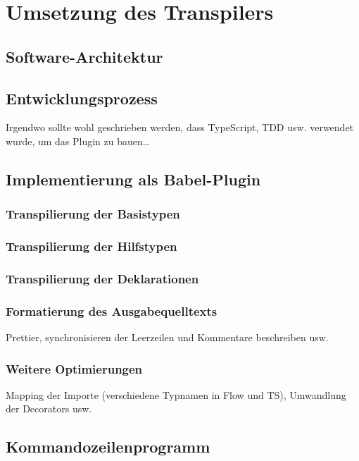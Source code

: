 \chapter{Umsetzung des Transpilers}

\section{Software-Architektur}

\section{Entwicklungsprozess}
  Irgendwo sollte wohl geschrieben werden, dass TypeScript, TDD usw. verwendet wurde, um das Plugin zu bauen\dots

\section{Implementierung als Babel-Plugin}
  \subsection{Transpilierung der Basistypen}
  \subsection{Transpilierung der Hilfstypen}
  \subsection{Transpilierung der Deklarationen}

  \subsection{Formatierung des Ausgabequelltexts}

  Prettier, synchronisieren der Leerzeilen und Kommentare beschreiben usw.

  \subsection{Weitere Optimierungen}

  Mapping der Importe (verschiedene Typnamen in Flow und TS), Umwandlung der Decorators usw.

\section{Kommandozeilenprogramm}

